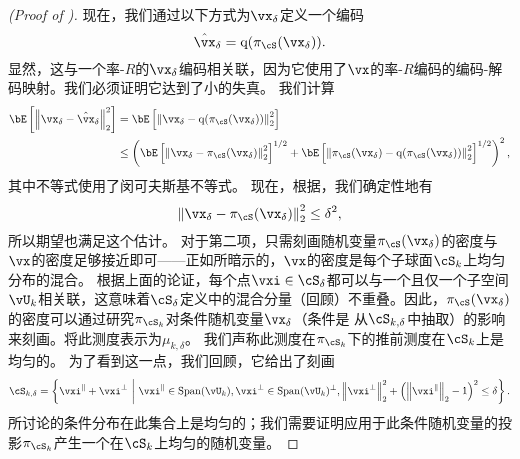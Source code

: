 \documentclass[../../book-main_zh.tex]{subfiles}
\begin{document}
\begin{proof}[(Proof of )]
    现在，我们通过以下方式为$\vx_{\delta}$定义一个编码
    \begin{equation}
        \hat{\vx}_{\delta} = \mathrm{q}( \pi_{\cS}(\vx_{\delta}) ).
    \end{equation}
    显然，这与一个率-$R$的$\vx_{\delta}$编码相关联，因为它使用了$\vx$的率-$R$编码的编码-解码映射。我们必须证明它达到了小的失真。
    我们计算
    \begin{align}
        \bE\left[ \norm*{ \vx_{\delta} - \hat{\vx}_{\delta} }_2^2 \right]
        &=
        \bE\left[ \norm*{ \vx_{\delta} - \mathrm{q}(\pi_{\cS}(\vx_{\delta})) }_2^2 \right]
        \\
        &\leq
        \left(
        \bE\left[ \norm*{ \vx_{\delta} - \pi_{\cS}(\vx_{\delta}) }_2^2
        \right]^{1/2}
        + \bE\left[ \norm*{ \pi_{\cS}(\vx_{\delta})
        - \mathrm{q}(\pi_{\cS}(\vx_{\delta})) }_2^2 \right]^{1/2}
        \right)^2,\label{eq:distortion-decomposition}
    \end{align}
    其中不等式使用了闵可夫斯基不等式。
    现在，根据，我们确定性地有
    \begin{equation}
        \norm*{ \vx_{\delta} - \pi_{\cS}(\vx_{\delta}) }_2^2
        \leq \delta^2,
    \end{equation}
    所以期望也满足这个估计。
    对于第二项，只需刻画随机变量$\pi_{\cS}(\vx_{\delta})$的密度与$\vx$的密度足够接近即可——正如所暗示的，$\vx$的密度是每个子球面$\cS_k$上均匀分布的混合。
    根据上面的论证，每个点$\vxi \in \cS_{\delta}$都可以与一个且仅一个子空间$\vU_k$相关联，这意味着$\cS_{\delta}$定义中的混合分量（回顾）不重叠。因此，$\pi_{\cS}(\vx_{\delta})$的密度可以通过研究$\pi_{\cS_k}$对条件随机变量$\vx_{\delta}$（条件是 从$\cS_{k, \delta}$中抽取）的影响来刻画。将此测度表示为$\mu_{k, \delta}$。
    我们声称此测度在$\pi_{\cS_k}$下的推前测度在$\cS_k$上是均匀的。
    为了看到这一点，我们回顾，它给出了刻画
    \begin{equation}
        \cS_{k, \delta} = \set*{
            \vxi^{\|} + \vxi^{\perp} 
            \given 
            \vxi^{\|} \in \Span(\vU_k),
            \vxi^{\perp} \in \Span(\vU_k)^\perp,
            \norm*{\vxi^{\perp}}_2^2
            + \left( \norm*{\vxi^{\|}}_2 - 1 \right)^2
            \leq
            \delta
        }.
    \end{equation}
    所讨论的条件分布在此集合上是均匀的；我们需要证明应用于此条件随机变量的投影$\pi_{\cS_k}$产生一个在$\cS_k$上均匀的随机变量。

\end{proof}
\end{document}
